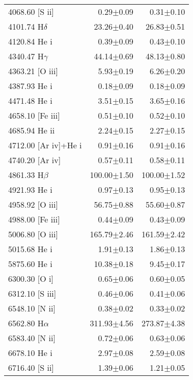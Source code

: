 \begin{table}
\begin{tabular}{lrr}
4068.60 [S {\sc ii}]            &  0.29$\pm$0.09&  0.31$\pm$0.10\\
4101.74 H$\delta$               & 23.26$\pm$0.40& 26.83$\pm$0.51\\
4120.84 He {\sc i}              &  0.39$\pm$0.09&  0.43$\pm$0.10\\
4340.47 H$\gamma$               & 44.14$\pm$0.69& 48.13$\pm$0.80\\
4363.21 [O {\sc iii}]           &  5.93$\pm$0.19&  6.26$\pm$0.20\\
4387.93 He {\sc i}              &  0.18$\pm$0.09&  0.18$\pm$0.09\\
4471.48 He {\sc i}              &  3.51$\pm$0.15&  3.65$\pm$0.16\\
4658.10 [Fe {\sc iii}]          &  0.51$\pm$0.10&  0.52$\pm$0.10\\
4685.94 He {\sc ii}             &  2.24$\pm$0.15&  2.27$\pm$0.15\\
4712.00 [Ar {\sc iv}]+He {\sc i}&  0.91$\pm$0.16&  0.91$\pm$0.16\\
4740.20 [Ar {\sc iv}]           &  0.57$\pm$0.11&  0.58$\pm$0.11\\
4861.33 H$\beta$                &100.00$\pm$1.50&100.00$\pm$1.52\\
4921.93 He {\sc i}              &  0.97$\pm$0.13&  0.95$\pm$0.13\\
4958.92 [O {\sc iii}]           & 56.75$\pm$0.88& 55.60$\pm$0.87\\
4988.00 [Fe {\sc iii}]          &  0.44$\pm$0.09&  0.43$\pm$0.09\\
5006.80 [O {\sc iii}]           &165.79$\pm$2.46&161.59$\pm$2.42\\
5015.68 He {\sc i}              &  1.91$\pm$0.13&  1.86$\pm$0.13\\
5875.60 He {\sc i}              & 10.38$\pm$0.18&  9.45$\pm$0.17\\
6300.30 [O {\sc i}]             &  0.65$\pm$0.06&  0.60$\pm$0.05\\
6312.10 [S {\sc iii}]           &  0.46$\pm$0.06&  0.41$\pm$0.06\\
6548.10 [N {\sc ii}]            &  0.38$\pm$0.02&  0.33$\pm$0.02\\
6562.80 H$\alpha$               &311.93$\pm$4.56&273.87$\pm$4.38\\
6583.40 [N {\sc ii}]            &  0.72$\pm$0.06&  0.63$\pm$0.06\\
6678.10 He {\sc i}              &  2.97$\pm$0.08&  2.59$\pm$0.08\\
6716.40 [S {\sc ii}]            &  1.39$\pm$0.06&  1.21$\pm$0.05\\

\end{tabular}
\end{table}
